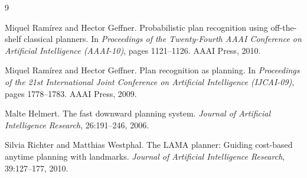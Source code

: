 \documentclass[10pt,twocolumn]{article}
\begin{document}

\begin{thebibliography}{9}

Miquel Ramírez and Hector Geffner.
\newblock Probabilistic plan recognition using off-the-shelf classical planners.
\newblock In \emph{Proceedings of the Twenty-Fourth AAAI Conference on Artificial Intelligence (AAAI-10)}, pages 1121--1126. AAAI Press, 2010.

Miquel Ramírez and Hector Geffner.
\newblock Plan recognition as planning.
\newblock In \emph{Proceedings of the 21st International Joint Conference on Artificial Intelligence (IJCAI-09)}, pages 1778--1783. AAAI Press, 2009.

Malte Helmert.
\newblock The fast downward planning system.
\newblock \emph{Journal of Artificial Intelligence Research}, 26:191--246, 2006.

Silvia Richter and Matthias Westphal.
\newblock The {LAMA} planner: Guiding cost-based anytime planning with landmarks.
\newblock \emph{Journal of Artificial Intelligence Research}, 39:127--177, 2010.

\end{thebibliography}
\end{document}
